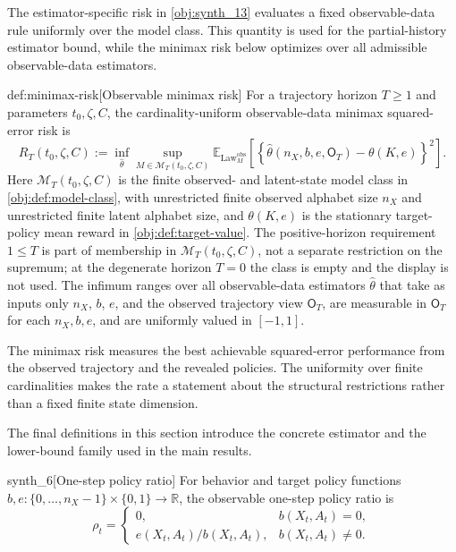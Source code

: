 The estimator-specific risk in \cref{obj:synth_13} evaluates a fixed observable-data rule uniformly over the model class. This quantity is used for the partial-history estimator bound, while the minimax risk below optimizes over all admissible observable-data estimators.

\begin{definitionv}{def:minimax-risk}[Observable minimax risk]
For a trajectory horizon \(T\ge 1\) and parameters \(t_0,\zeta,C\), the cardinality-uniform observable-data minimax squared-error risk is
\[
R_T(t_0,\zeta,C)
:=
\inf_{\widehat\theta}
\sup_{M\in\mathcal M_T(t_0,\zeta,C)}
\mathbb E_{\operatorname{Law}^{\mathrm{obs}}_M}
\!\left[
\left\{\widehat\theta(n_X,b,e,\mathsf O_T)-\theta(K,e)\right\}^2
\right].
\]
Here \(\mathcal M_T(t_0,\zeta,C)\) is the finite observed- and latent-state model class in \cref{obj:def:model-class}, with unrestricted finite observed alphabet size \(n_X\) and unrestricted finite latent alphabet size, and \(\theta(K,e)\) is the stationary target-policy mean reward in \cref{obj:def:target-value}. The positive-horizon requirement \(1\le T\) is part of membership in \(\mathcal M_T(t_0,\zeta,C)\), not a separate restriction on the supremum; at the degenerate horizon \(T=0\) the class is empty and the display is not used. The infimum ranges over all observable-data estimators \(\widehat\theta\) that take as inputs only \(n_X\), \(b\), \(e\), and the observed trajectory view \(\mathsf O_T\), are measurable in \(\mathsf O_T\) for each \(n_X,b,e\), and are uniformly valued in \([-1,1]\).
\end{definitionv}

The minimax risk  measures the best achievable squared-error performance from the observed trajectory and the revealed policies. The uniformity over finite cardinalities makes the rate a statement about the structural restrictions rather than a fixed finite state dimension.

The final definitions in this section introduce the concrete estimator and the lower-bound family used in the main results.

\begin{definitionv}{synth_6}[One-step policy ratio]
For behavior and target policy functions \(b,e : \{0,\ldots,n_X-1\}\times\{0,1\}\to\mathbb R\), the observable one-step policy ratio is
\[
\rho_t
=
\begin{cases}
0, & b(X_t,A_t)=0,\\
e(X_t,A_t)/b(X_t,A_t), & b(X_t,A_t)\ne 0.
\end{cases}
\]
\end{definitionv}

